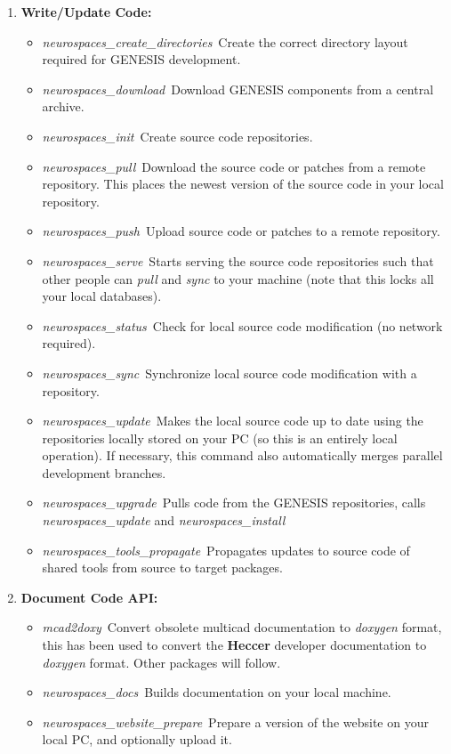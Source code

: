 \documentclass[12pt]{article}
\begin{document}
\begin{enumerate}
   \item {\bf Write/Update Code:}
   \begin{itemize}
      \item {\it neurospaces\_create\_directories}\,\,\,Create the correct directory layout required for GENESIS development.
      \item {\it neurospaces\_download}\,\,\,Download GENESIS components from a central archive.
      \item {\it neurospaces\_init}\,\,\,Create source code repositories.
      \item {\it neurospaces\_pull}\,\,\,Download the source code or patches from a remote repository. This places the newest version of the source 
      code in your local repository.
      \item {\it neurospaces\_push}\,\,\,Upload source code or patches to a remote repository.
      \item {\it neurospaces\_serve}\,\,\,Starts serving the source code repositories such that other people can {\it pull} and {\it sync} to your machine (note that this locks all your local databases).
      \item {\it neurospaces\_status}\,\,\,Check for local source code modification (no network required).
      \item {\it neurospaces\_sync}\,\,\,Synchronize local source code modification with a repository.
      \item {\it neurospaces\_update}\,\,\,Makes the local source code up to date using the repositories locally stored on your PC (so this is an entirely local operation). If necessary, this command also automatically merges parallel development branches.
      \item {\it neurospaces\_upgrade}\,\,\,Pulls code from the GENESIS repositories, calls {\it neurospaces\_update} and {\it neurospaces\_install}
      \item {\it neurospaces\_tools\_propagate}\,\,\,Propagates updates to source code of shared tools from source to target packages.
   \end{itemize}
  
   \item{\bf Document Code API:}
   \begin{itemize}
      \item {\it mcad2doxy}\,\,\,Convert obsolete multicad documentation to {\it doxygen} format, this has been used to convert the {\bf Heccer} 
      developer documentation to {\it doxygen} format. Other packages will follow.
      \item {\it neurospaces\_docs}\,\,\,Builds documentation on your local machine.
      \item {\it neurospaces\_website\_prepare}\,\,\,Prepare a version of the website on your local PC, and optionally upload it. 
   \end{itemize}
  

\end{enumerate}
\end{document}
